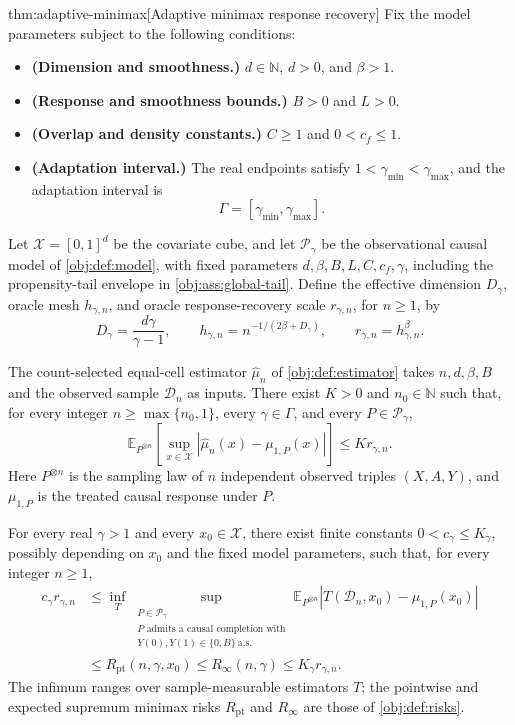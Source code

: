 \begin{theoremv}{thm:adaptive-minimax}[Adaptive minimax response recovery]
Fix the model parameters subject to the following conditions:
\begin{itemize}
\item \textbf{(Dimension and smoothness.)} \(d\in\mathbb N\), \(d>0\), and \(\beta>1\).
\item \textbf{(Response and smoothness bounds.)} \(B>0\) and \(L>0\).
\item \textbf{(Overlap and density constants.)} \(C\ge1\) and \(0<c_f\le1\).
\item \textbf{(Adaptation interval.)} The real endpoints satisfy \(1<\gamma_{\min}<\gamma_{\max}\), and the adaptation interval is
\[
\Gamma=[\gamma_{\min},\gamma_{\max}].
\]
\end{itemize}
Let \(\mathcal X=[0,1]^d\) be the covariate cube, and let \(\mathcal P_\gamma\) be the observational causal model of \cref{obj:def:model}, with fixed parameters \(d,\beta,B,L,C,c_f,\gamma\), including the propensity-tail envelope in \cref{obj:ass:global-tail}. Define the effective dimension \(D_\gamma\), oracle mesh \(h_{\gamma,n}\), and oracle response-recovery scale \(r_{\gamma,n}\), for \(n\ge1\), by
\[
D_\gamma=\frac{d\gamma}{\gamma-1},
\qquad
h_{\gamma,n}=n^{-1/(2\beta+D_\gamma)},
\qquad
r_{\gamma,n}=h_{\gamma,n}^{\beta}.
\]

The count-selected equal-cell estimator \(\widehat\mu_n\) of \cref{obj:def:estimator} takes \(n,d,\beta,B\) and the observed sample \(\mathcal D_n\) as inputs. There exist \(K>0\) and \(n_0\in\mathbb N\) such that, for every integer \(n\ge\max\{n_0,1\}\), every \(\gamma\in\Gamma\), and every \(P\in\mathcal P_\gamma\),
\[
\mathbb E_{P^{\otimes n}}
\left[
\sup_{x\in\mathcal X}
\left|\widehat\mu_n(x)-\mu_{1,P}(x)\right|
\right]
\le K r_{\gamma,n}.
\]
Here \(P^{\otimes n}\) is the sampling law of \(n\) independent observed triples \((X,A,Y)\), and \(\mu_{1,P}\) is the treated causal response under \(P\).

For every real \(\gamma>1\) and every \(x_0\in\mathcal X\), there exist finite constants \(0<c_\gamma\le K_\gamma\), possibly depending on \(x_0\) and the fixed model parameters, such that, for every integer \(n\ge1\),
\[
\begin{aligned}
c_\gamma r_{\gamma,n}
&\le
\inf_T
\sup_{\substack{P\in\mathcal P_\gamma\\
P\text{ admits a causal completion with}\\
Y(0),Y(1)\in\{0,B\}\ \text{a.s.}}}
\mathbb E_{P^{\otimes n}}
\left|T(\mathcal D_n,x_0)-\mu_{1,P}(x_0)\right|
\\
&\le R_{\mathrm{pt}}(n,\gamma,x_0)
\le R_\infty(n,\gamma)
\le K_\gamma r_{\gamma,n}.
\end{aligned}
\]
The infimum ranges over sample-measurable estimators \(T\); the pointwise and expected supremum minimax risks \(R_{\mathrm{pt}}\) and \(R_\infty\) are those of \cref{obj:def:risks}.
\end{theoremv}

